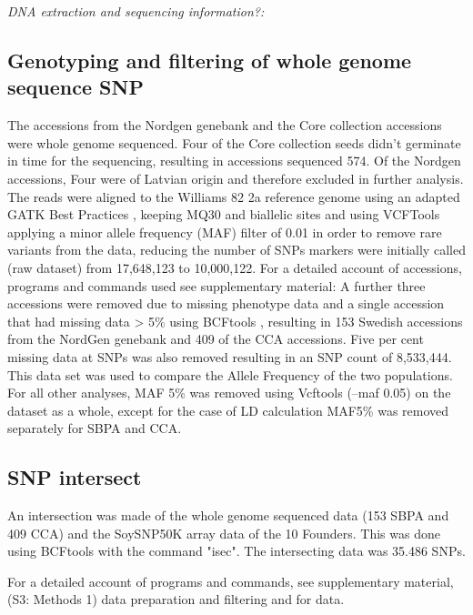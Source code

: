 \documentclass[9pt, onecolumn,twoside]{gsajnl}
\begin{document}
\textit{DNA extraction and sequencing information?:}

\subsection{Genotyping and filtering of whole genome sequence SNP}
The accessions from the Nordgen genebank and the Core collection accessions were whole genome sequenced. Four of the Core collection seeds didn't germinate in time for the sequencing, resulting in accessions sequenced 574. Of the Nordgen accessions, Four were of Latvian origin and therefore excluded in further analysis. 
The reads were aligned to the Williams 82 2a reference genome \cite{schmutz10} using an adapted GATK Best Practices \cite{mckenna10}, keeping MQ30 and biallelic sites and using VCFTools \cite{danecek11} applying a minor allele frequency (MAF) filter of 0.01 in order to remove rare variants from the data, reducing the number of SNPs markers were initially called (raw dataset) from 17,648,123 to 10,000,122. 
For a detailed account of accessions, programs and commands used see supplementary material:  
A further three accessions were removed due to missing phenotype data and a single accession that had missing data > 5$\%$ using BCFtools \cite{danecek21}, resulting in 153 Swedish accessions from the NordGen genebank and 409 of the CCA accessions. Five per cent missing data at SNPs was also removed resulting in an SNP count of 8,533,444. This data set was used to compare the Allele Frequency of the two populations. For all other analyses, MAF 5\%  was removed using Vcftools (--maf 0.05) on the dataset as a whole, except for the case of LD calculation MAF5\% was removed separately for SBPA and CCA.  

\subsection{SNP intersect }
An intersection was made of the whole genome sequenced data (153 SBPA and 409 CCA) and the SoySNP50K array data of the 10 Founders.  This was done using BCFtools with the command "isec". The intersecting data was 35.486 SNPs. 

For a detailed account of programs and commands, see supplementary material,  (S3: Methods 1) data preparation and filtering and  for data. 
\end{document}
